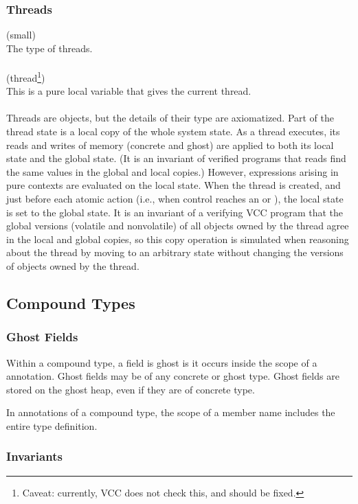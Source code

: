 \documentclass[preprint,nocopyrightspace]{sigplanconf}
\begin{document}
{{{\subsubsection{Threads}
\vcc{\thread} (small) \\
The type of threads. 
\\\\
 (thread\footnote{Caveat: currently, VCC does
not check this, and should be fixed.})\\
This is a pure local variable that gives the current
thread. 
\\\\
Threads are objects, but the details of their type
are axiomatized. Part of the thread state is a local copy of 
the whole system state. As a thread executes, its reads and writes of
memory (concrete and ghost) are applied to both its local state and
the global state. (It is an invariant of verified programs that reads
find the same values in the global and local copies.)  However,
expressions arising in pure contexts are evaluated on the local state.
When the thread is created, and just before each atomic action (i.e.,
when control reaches an  or ), the
local state is set to the global 
state. It is an invariant of a verifying VCC program that the global
versions (volatile and nonvolatile) of all objects owned by the thread
agree in the local and global copies, so this copy operation is
simulated when reasoning about the thread by moving to an arbitrary
state without changing the versions of objects owned by the thread. 

\subsection{Compound Types}
 
\subsubsection{Ghost Fields}
Within a compound type, a field is ghost is it occurs inside the scope
of a   annotation. Ghost fields may be of any concrete
or ghost type. Ghost fields are stored on the ghost heap, even if they
are of concrete type.

In annotations of a compound type, the scope of a member name includes
the entire type definition.

\subsubsection{Invariants}

}}}
\end{document}
